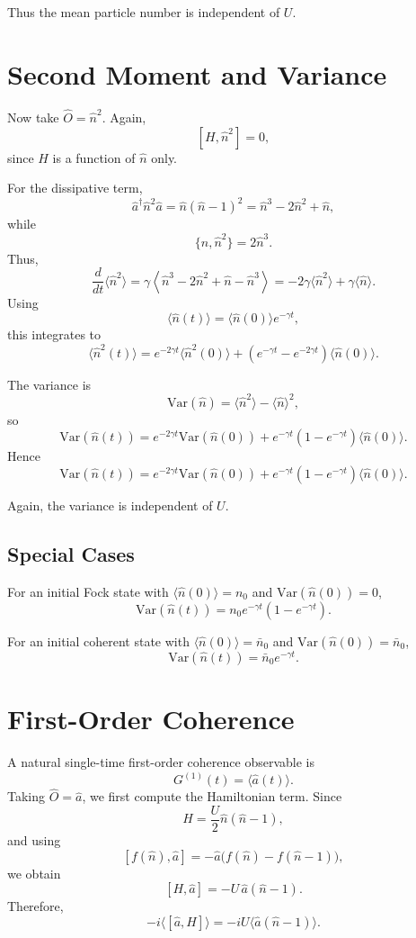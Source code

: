 \documentclass[12pt]{article}
\begin{document}
Thus the mean particle number is independent of $U$.

\section*{Second Moment and Variance}
Now take $\hat O=\hat n^2$. Again,
\[
[H,\hat n^2]=0,
\]
since $H$ is a function of $\hat n$ only.

For the dissipative term,
\[
\hat a^\dagger \hat n^2 \hat a
= \hat n(\hat n-1)^2
= \hat n^3 - 2\hat n^2 + \hat n,
\]
while
\[
\{\hat n,\hat n^2\}=2\hat n^3.
\]
Thus,
\[
\frac{d}{dt}\langle \hat n^2\rangle
= \gamma\left\langle
\hat n^3 - 2\hat n^2 + \hat n - \hat n^3
\right\rangle
= -2\gamma \langle \hat n^2\rangle + \gamma \langle \hat n\rangle.
\]
Using
\[
\langle \hat n(t)\rangle = \langle \hat n(0)\rangle e^{-\gamma t},
\]
this integrates to
\[
\boxed{
\langle \hat n^2(t)\rangle
= e^{-2\gamma t}\langle \hat n^2(0)\rangle
+\left(e^{-\gamma t}-e^{-2\gamma t}\right)\langle \hat n(0)\rangle.
}
\]

The variance is
\[
\mathrm{Var}(\hat n)
= \langle \hat n^2\rangle - \langle \hat n\rangle^2,
\]
so
\[
\mathrm{Var}(\hat n(t))
= e^{-2\gamma t}\mathrm{Var}(\hat n(0))
+ e^{-\gamma t}\left(1-e^{-\gamma t}\right)\langle \hat n(0)\rangle.
\]
Hence
\[
\boxed{
\mathrm{Var}(\hat n(t))
= e^{-2\gamma t}\mathrm{Var}(\hat n(0))
+ e^{-\gamma t}\left(1-e^{-\gamma t}\right)\langle \hat n(0)\rangle.
}
\]

Again, the variance is independent of $U$.

\subsection*{Special Cases}
For an initial Fock state with $\langle \hat n(0)\rangle=n_0$ and $\mathrm{Var}(\hat n(0))=0$,
\[
\boxed{
\mathrm{Var}(\hat n(t))
= n_0 e^{-\gamma t}\left(1-e^{-\gamma t}\right).
}
\]

For an initial coherent state with $\langle \hat n(0)\rangle=\bar n_0$ and $\mathrm{Var}(\hat n(0))=\bar n_0$,
\[
\boxed{
\mathrm{Var}(\hat n(t))
= \bar n_0 e^{-\gamma t}.
}
\]

\section*{First-Order Coherence}
A natural single-time first-order coherence observable is
\[
G^{(1)}(t)=\langle \hat a(t)\rangle.
\]
Taking $\hat O=\hat a$, we first compute the Hamiltonian term. Since
\[
H=\frac{U}{2}\hat n(\hat n-1),
\]
and using
\[
[f(\hat n),\hat a] = -\hat a\bigl(f(\hat n)-f(\hat n-1)\bigr),
\]
we obtain
\[
[H,\hat a] = -U\,\hat a(\hat n-1).
\]
Therefore,
\[
-i\langle[\hat a,H]\rangle
= -iU\langle \hat a(\hat n-1)\rangle.
\]
\end{document}
